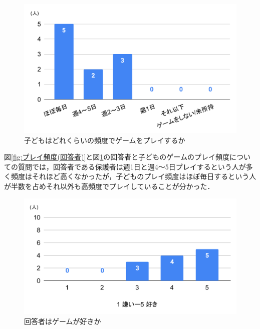 \documentclass[12pt,a4j,titlepage]{ltjsarticle}
\begin{document}
\begin{figure}[H]
 \begin{center}
  \includegraphics[keepaspectratio, scale=0.6]{PDF/chart3.pdf}
 \end{center}
 \caption{子どもはどれくらいの頻度でゲームをプレイするか}
 \label{fig:プレイ頻度(子ども)}
\end{figure}

図\ref{fig:プレイ頻度(回答者)}と図\ref{fig:プレイ頻度(子ども)}の回答者と子どものゲームのプレイ頻度についての質問では，回答者である保護者は週1日と週4～5日プレイするという人が多く頻度はそれほど高くなかったが，子どものプレイ頻度はほぼ毎日するという人が半数を占めそれ以外も高頻度でプレイしていることが分かった．

\begin{figure}[H]
 \begin{center}
  \includegraphics[keepaspectratio, scale=0.6]{PDF/chart4.pdf}
 \end{center}
 \caption{回答者はゲームが好きか}
 \label{fig:好き嫌い(回答者)}
\end{figure}
\end{document}
